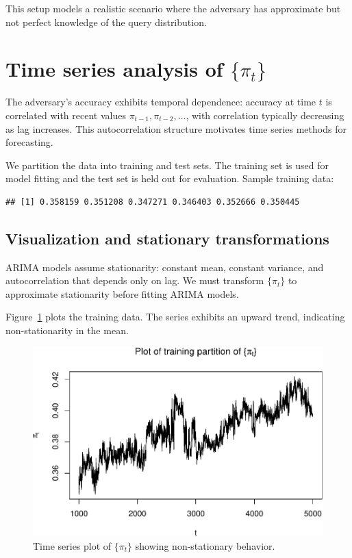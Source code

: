 \documentclass[final,11pt]{article}
\theoremstyle{plain}
\theoremstyle{remark}
\begin{document}
This setup models a realistic scenario where the adversary has approximate
but not perfect knowledge of the query distribution.

\hypertarget{time-series-analysis-of-pi_t}{%
\section{\texorpdfstring{Time series analysis of
\(\{\pi_t\}\)}{Time series analysis of \textbackslash\{\textbackslash pi\_t\textbackslash\}}}\label{time-series-analysis-of-pi_t}}

The adversary's accuracy exhibits temporal dependence: accuracy at time $t$
is correlated with recent values $\pi_{t-1}, \pi_{t-2}, \ldots$, with
correlation typically decreasing as lag increases. This autocorrelation
structure motivates time series methods for forecasting.

We partition the data into training and test sets. The training set is used
for model fitting and the test set is held out for evaluation. Sample
training data:

\begin{verbatim}
## [1] 0.358159 0.351208 0.347271 0.346403 0.352666 0.350445
\end{verbatim}

\hypertarget{visualization-and-stationary-transformations}{%
\subsection{Visualization and stationary
transformations}\label{visualization-and-stationary-transformations}}

ARIMA models assume stationarity: constant mean, constant variance, and
autocorrelation that depends only on lag. We must transform $\{\pi_t\}$ to
approximate stationarity before fitting ARIMA models.

Figure~\ref{fig:fa} plots the training data. The series exhibits an
upward trend, indicating non-stationarity in the mean.

\begin{figure}
\includegraphics{paper_files/figure-latex/unnamed-chunk-2-1.pdf}
\caption{Time series plot of $\{\pi_t\}$ showing non-stationary behavior.}
\label{fig:fa}
\end{figure}
\end{document}
